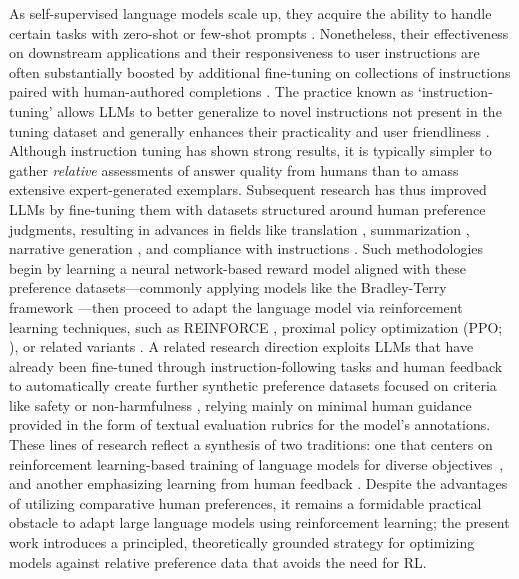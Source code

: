 As self-supervised language models scale up, they acquire the ability to handle certain tasks with zero-shot \citep{radford2019language} or few-shot prompts \citep{gpt3,megatron,chowdhery2022palm}. Nonetheless, their effectiveness on downstream applications and their responsiveness to user instructions are often substantially boosted by additional fine-tuning on collections of instructions paired with human-authored completions \citep{mishra-etal-2022-cross,sanh2022multitask,chung2022scaling,thoppilan2022lamda}. The practice known as `instruction-tuning' allows LLMs to better generalize to novel instructions not present in the tuning dataset and generally enhances their practicality and user friendliness \citep{chung2022scaling}. Although instruction tuning has shown strong results, it is typically simpler to gather \textit{relative} assessments of answer quality from humans than to amass extensive expert-generated exemplars. Subsequent research has thus improved LLMs by fine-tuning them with datasets structured around human preference judgments, resulting in advances in fields like translation \citep{kreutzer-etal-2018-reliability}, summarization \citep{stiennon2022learning,ziegler2020finetuning}, narrative generation \citep{ziegler2020finetuning}, and compliance with instructions \citep{ouyang2022training,ramamurthy2023is}. Such methodologies begin by learning a neural network-based reward model aligned with these preference datasets—commonly applying models like the Bradley-Terry framework \citep{bradley1952rankanalysis}—then proceed to adapt the language model via reinforcement learning techniques, such as REINFORCE \citep{williams1992reinforce}, proximal policy optimization (PPO; \cite{schulman2017proximal}), or related variants \citep{ramamurthy2023is}. A related research direction exploits LLMs that have already been fine-tuned through instruction-following tasks and human feedback to automatically create further synthetic preference datasets focused on criteria like safety or non-harmfulness \citep{bai2022constitutional}, relying mainly on minimal human guidance provided in the form of textual evaluation rubrics for the model's annotations. These lines of research reflect a synthesis of two traditions: one that centers on reinforcement learning-based training of language models for diverse objectives~\citep{Ranzato2015SequenceLT,paulus2018a,wu2018learning}, and another emphasizing learning from human feedback \citep{christiano2017deep,kupcsik2018learning}. Despite the advantages of utilizing comparative human preferences, it remains a formidable practical obstacle to adapt large language models using reinforcement learning; the present work introduces a principled, theoretically grounded strategy for optimizing models against relative preference data that avoids the need for RL.


